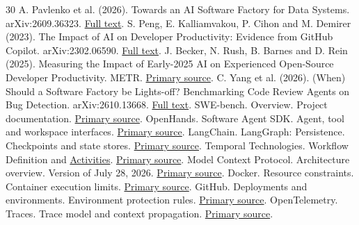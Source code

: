 \documentclass[11pt,a4paper]{article}
\newcommand{\paperlink}[1]{\href{https://www.alphaxiv.org/pdf/#1}{Full text}}
\begin{document}
\begin{thebibliography}{30}
 A. Pavlenko et al. (2026). Towards an AI Software Factory for Data Systems. arXiv:2609.36323. \paperlink{2609.36323}.
 S. Peng, E. Kalliamvakou, P. Cihon and M. Demirer (2023). The Impact of AI on Developer Productivity: Evidence from GitHub Copilot. arXiv:2302.06590. \paperlink{2302.06590}.
 J. Becker, N. Rush, B. Barnes and D. Rein (2025). Measuring the Impact of Early-2025 AI on Experienced Open-Source Developer Productivity. METR. \href{https://metr.org/blog/2025-07-10-early-2025-ai-experienced-os-dev-study/}{Primary source}.
 C. Yang et al. (2026). (When) Should a Software Factory be Lights-off? Benchmarking Code Review Agents on Bug Detection. arXiv:2610.13668. \paperlink{2610.13668}.
 SWE-bench. Overview. Project documentation. \href{https://www.swebench.com/SWE-bench/}{Primary source}.
 OpenHands. Software Agent SDK. Agent, tool and workspace interfaces. \href{https://docs.openhands.dev/sdk}{Primary source}.
 LangChain. LangGraph: Persistence. Checkpoints and state stores. \href{https://docs.langchain.com/oss/python/langgraph/persistence}{Primary source}.
 Temporal Technologies. Workflow Definition and \href{https://docs.temporal.io/activities}{Activities}. \href{https://docs.temporal.io/workflow-definition}{Primary source}.
 Model Context Protocol. Architecture overview. Version of July 28, 2026. \href{https://modelcontextprotocol.io/docs/2026-07-28/learn/architecture}{Primary source}.
 Docker. Resource constraints. Container execution limits. \href{https://docs.docker.com/engine/containers/resource_constraints/}{Primary source}.
 GitHub. Deployments and environments. Environment protection rules. \href{https://docs.github.com/en/actions/reference/workflows-and-actions/deployments-and-environments}{Primary source}.
 OpenTelemetry. Traces. Trace model and context propagation. \href{https://opentelemetry.io/docs/concepts/signals/traces/}{Primary source}.
\end{thebibliography}
\clearpage
\appendix
\end{document}
